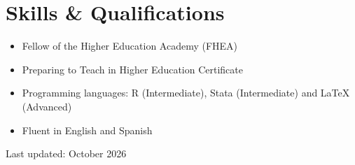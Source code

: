 \documentclass[11pt]{article}
\begin{document}
\section{Skills \& Qualifications}
\begin{itemize}
  \item Fellow of the Higher Education Academy (FHEA)
  \item Preparing to Teach in Higher Education Certificate
  \item Programming languages: R (Intermediate), Stata (Intermediate) and LaTeX (Advanced)
  \item Fluent in English and Spanish
\end{itemize}

\vfill
{\footnotesize\color{gray} Last updated: October 2026}
\end{document}

